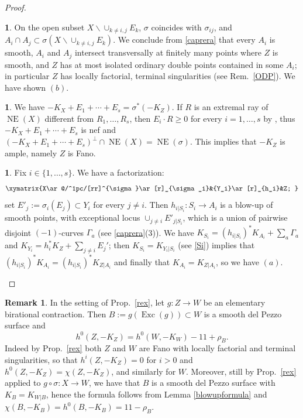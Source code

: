 \documentclass[a4paper,12pt]{amsart}
\theoremstyle{definition}
\newtheorem{remark}[thm]{Remark}
\newtheorem{prg}[thm]{}
\numberwithin{figure}{section}
\numberwithin{table}{section}
\newcommand{\NE}{\operatorname{NE}}
\newcommand{\Exc}{\operatorname{Exc}}
\begin{document}
\begin{proof}
\begin{prg}
On the open subset $X\smallsetminus\cup_{k\neq i,j}E_k$, $\sigma$ coincides with  $\sigma_{ij}$, and $A_i\cap A_j\subset\sigma(X\smallsetminus\cup_{k\neq i,j}E_k)$. We conclude from \ref{caprera}
 that every
 $A_i$ is smooth,  $A_i$ and $A_j$ intersect transversally at finitely many points where $Z$ is smooth, and $Z$ has at most isolated ordinary double points contained in some $A_i$; in particular $Z$ has locally factorial, terminal singularities (see Rem.~\ref{ODP}). We have shown $(b)$.
\end{prg}
\begin{prg}
  We have $-K_X+E_1+\cdots+E_s=\sigma^*(-K_Z)$. If $R$ is an extremal ray of $\NE(X)$ different from $R_1,\dotsc,R_s$, then $E_i\cdot R\geq 0$ for every $i=1,\dotsc,s$ by  \cite[Lemma 2.3]{32}, thus $-K_X+E_1+\cdots+E_s$ is nef and $(-K_X+E_1+\cdots+E_s)^{\perp}\cap\NE(X)=\NE(\sigma)$. This implies that $-K_Z$ is ample, namely $Z$ is Fano.
\end{prg}
\begin{prg}
 Fix $i\in\{1,\dotsc,s\}$. We have a factorization:
 \begin{equation}\label{luminy} \xymatrix{X\ar@/^1pc/[rr]^{\sigma}\ar[r]_{\sigma_i}&{Y_i}\ar[r]_{h_i}&Z;   }
   \end{equation}
 set $E'_j:=\sigma_i(E_j)\subset Y_i$ for every $j\neq i$. Then  $h_{i|S_i}\colon S_i\to A_i$ is a blow-up of smooth points, with exceptional locus $\cup_{j\neq i}E'_{j|S_i}$, which is a union of pairwise disjoint $(-1)$-curves $\Gamma_a$ (see \ref{caprera}(3)). We have $K_{S_i}=(h_{i|S_i})^*K_{A_i}+\sum_a\Gamma_a$ and $K_{Y_i}=h_i^*K_Z+\sum_{j\neq i} E_j'$; then $K_{S_i}=K_{Y_i|S_i}$ (see \ref{Si})  implies that $(h_{i|S_i})^*K_{A_i}=(h_{i|S_i})^*K_{Z|A_i}$ and finally that $K_{A_i}=K_{Z|A_i}$, so we have $(a)$.\qedhere
\end{prg}
\end{proof}
\begin{remark}\label{antsections}
 In the setting of Prop.~\ref{rex}, let $g\colon Z\to W$ be an elementary birational contraction.
 Then  $B:=g(\Exc(g))\subset W$ is a smooth del Pezzo surface and
 $$h^0(Z,-K_Z)=h^0(W,-K_W)-11+\rho_B.$$
 Indeed by Prop.~\ref{rex} both $Z$ and $W$ are Fano with locally factorial and terminal singularities, so that $h^i(Z,-K_Z)=0$ for $i>0$ and $h^0(Z,-K_Z)=\chi(Z,-K_Z)$, and similarly for $W$. Moreover, still by Prop.~\ref{rex} applied to $g\circ \sigma\colon X\to W$, we have that  $B$ is a smooth del Pezzo surface with $K_B=K_{W|B}$, hence the formula follows from Lemma \ref{blowupformula} and $\chi(B,-K_B)=h^0(B,-K_B)=11-\rho_B$.
               \end{remark}
\end{document}
